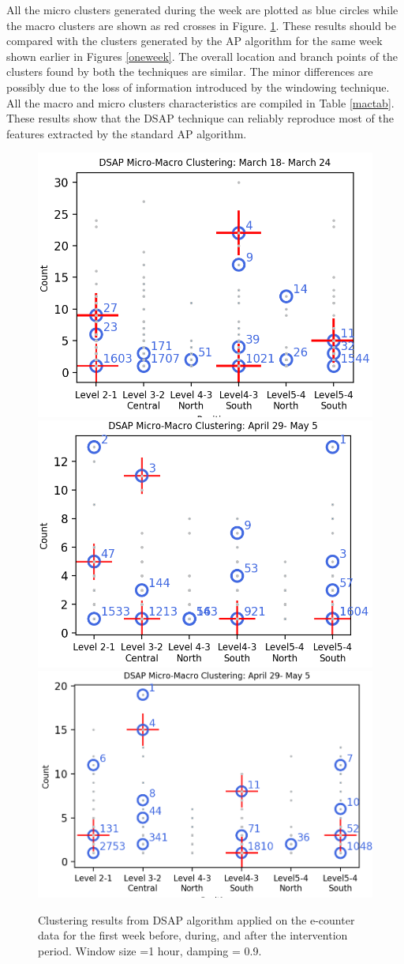 All the micro clusters generated during the week are plotted as blue circles while the macro clusters are shown as red crosses in Figure. \ref{dsap3week}. These results should be compared with the clusters generated by the AP algorithm for the same week shown earlier in Figures \ref{oneweek}. The overall location and branch points of the clusters found by both the techniques are similar. The minor differences are possibly due to the loss of information introduced by the windowing technique. All the macro and micro clusters characteristics are compiled in Table \ref{mactab}. These results show that the DSAP technique can reliably reproduce most of the features extracted by the standard AP algorithm. 


\begin{figure}[!t]
    \centering
    \includegraphics[width=.47\textwidth]{image/Chapters/Chapter6/beforeInte1week.png}
    \includegraphics[width=.47\textwidth]{image/Chapters/Chapter6/duringInte1week.png}
    \includegraphics[width=.47\textwidth]{image/Chapters/Chapter6/afterInte1week.png}
    \caption{Clustering results from DSAP algorithm applied on the e-counter data for the first week before, during, and after the intervention period. Window size =1 hour, damping = 0.9.}
    \label{dsap3week}
\end{figure}


